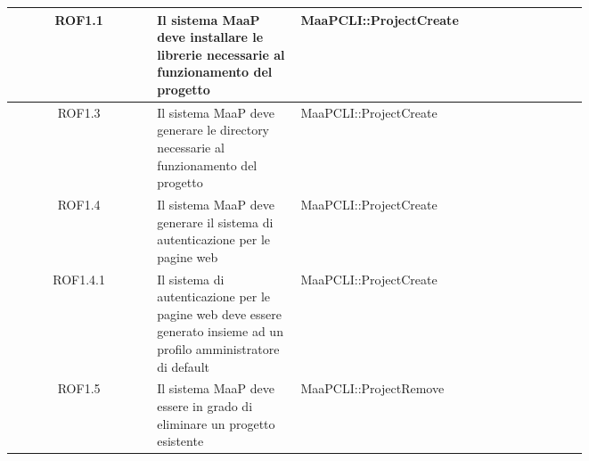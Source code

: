 \begin{center}
\begin{longtable}{|c|p{0.25\linewidth}|p{0.5\linewidth}|}
\midrule
ROF1.1
& Il sistema MaaP deve installare le librerie necessarie al funzionamento del progetto
& MaaPCLI::ProjectCreate\\

\midrule
ROF1.3
& Il sistema MaaP deve generare le directory necessarie al funzionamento del progetto
& MaaPCLI::ProjectCreate\\

\midrule
ROF1.4
& Il sistema MaaP deve generare il sistema di autenticazione per le pagine web
& MaaPCLI::ProjectCreate\\

\midrule
ROF1.4.1
& Il sistema di autenticazione per le pagine web deve essere generato insieme ad un profilo amministratore di default
& MaaPCLI::ProjectCreate\\

\midrule
ROF1.5
& Il sistema MaaP deve essere in grado di eliminare un progetto esistente
& MaaPCLI::ProjectRemove\\

\end{longtable}
\end{center}


